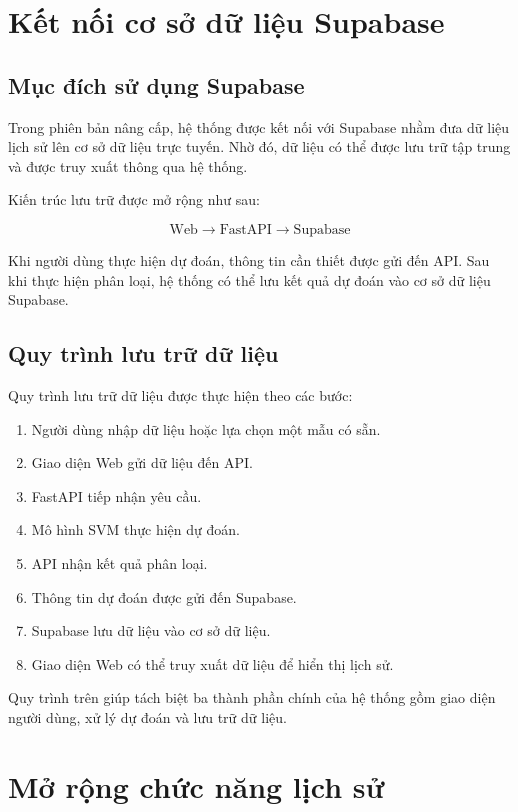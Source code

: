 \documentclass[12pt,a4paper]{report}
\begin{document}
	

	
	
	
	
	\section{Kết nối cơ sở dữ liệu Supabase}
	
	\subsection{Mục đích sử dụng Supabase}
	
	Trong phiên bản nâng cấp, hệ thống được kết nối với Supabase nhằm đưa dữ liệu lịch sử lên cơ sở dữ liệu trực tuyến. Nhờ đó, dữ liệu có thể được lưu trữ tập trung và được truy xuất thông qua hệ thống.
	
	Kiến trúc lưu trữ được mở rộng như sau:
	
	$$
	\text{Web}
	\rightarrow
	\text{FastAPI}
	\rightarrow
	\text{Supabase}
	$$
	
	Khi người dùng thực hiện dự đoán, thông tin cần thiết được gửi đến API. Sau khi thực hiện phân loại, hệ thống có thể lưu kết quả dự đoán vào cơ sở dữ liệu Supabase.
	
	\subsection{Quy trình lưu trữ dữ liệu}
	
	Quy trình lưu trữ dữ liệu được thực hiện theo các bước:
	
	\begin{enumerate}
		\item Người dùng nhập dữ liệu hoặc lựa chọn một mẫu có sẵn.
		\item Giao diện Web gửi dữ liệu đến API.
		\item FastAPI tiếp nhận yêu cầu.
		\item Mô hình SVM thực hiện dự đoán.
		\item API nhận kết quả phân loại.
		\item Thông tin dự đoán được gửi đến Supabase.
		\item Supabase lưu dữ liệu vào cơ sở dữ liệu.
		\item Giao diện Web có thể truy xuất dữ liệu để hiển thị lịch sử.
	\end{enumerate}
	
	Quy trình trên giúp tách biệt ba thành phần chính của hệ thống gồm giao diện người dùng, xử lý dự đoán và lưu trữ dữ liệu.
	
	\section{Mở rộng chức năng lịch sử}
	
\end{document}
